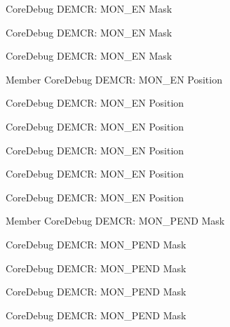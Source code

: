 \begin{DoxyRefList}
\label{deprecated__deprecated000054}%
%
Core\+Debug DEMCR\+: MON\+\_\+\+EN Mask 

\label{deprecated__deprecated000607}%
%
Core\+Debug DEMCR\+: MON\+\_\+\+EN Mask 

\label{deprecated__deprecated000340}%
%
Core\+Debug DEMCR\+: MON\+\_\+\+EN Mask  
\item[Member \doxylink{group__CMSIS__CoreDebug_ga802829678f6871863ae9ecf60a10425c}{Core\+Debug\+\_\+\+DEMCR\+\_\+\+MON\+\_\+\+EN\+\_\+\+Pos} ]\label{deprecated__deprecated000415}%
%
Core\+Debug DEMCR\+: MON\+\_\+\+EN Position 

\label{deprecated__deprecated000197}%
%
Core\+Debug DEMCR\+: MON\+\_\+\+EN Position 

\label{deprecated__deprecated000606}%
%
Core\+Debug DEMCR\+: MON\+\_\+\+EN Position 

\label{deprecated__deprecated000339}%
%
Core\+Debug DEMCR\+: MON\+\_\+\+EN Position 

\label{deprecated__deprecated000053}%
%
Core\+Debug DEMCR\+: MON\+\_\+\+EN Position 

\label{deprecated__deprecated000504}%
%
Core\+Debug DEMCR\+: MON\+\_\+\+EN Position  
\item[Member \doxylink{group__CMSIS__CoreDebug_ga68ec55930269fab78e733dcfa32392f8}{Core\+Debug\+\_\+\+DEMCR\+\_\+\+MON\+\_\+\+PEND\+\_\+\+Msk} ]\label{deprecated__deprecated000338}%
%
Core\+Debug DEMCR\+: MON\+\_\+\+PEND Mask 

\label{deprecated__deprecated000196}%
%
Core\+Debug DEMCR\+: MON\+\_\+\+PEND Mask 

\label{deprecated__deprecated000052}%
%
Core\+Debug DEMCR\+: MON\+\_\+\+PEND Mask 

\label{deprecated__deprecated000414}%
%
Core\+Debug DEMCR\+: MON\+\_\+\+PEND Mask 

\label{deprecated__deprecated000605}%
%
Core\+Debug DEMCR\+: MON\+\_\+\+PEND Mask 


\end{DoxyRefList}
